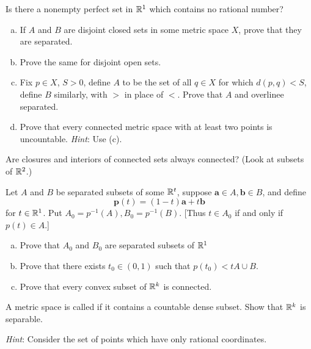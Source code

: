 \begin{myExercise}
    \label{ex:2.18}
    Is there a nonempty perfect set in ${\protect\mathbb R}^1$ which contains no rational number?
\end{myExercise}


\begin{myExercise}
    \label{ex:2.19}
    \begin{enumerate}[(a)]
        \item If $A$ and $B$ are disjoint closed sets in some metric space $X$, prove that they are separated.
        \item Prove the same for disjoint open sets. 
        \item Fix $p \in X$, $S > 0$, define $A$ to be the set of all $q \in X$ for which $d(p, q) < S$, define $B$ similarly, with $>$ in place of $<$. Prove that $A$ and overlinee separated.
        \item Prove that every connected metric space with at least two points is uncountable. \emph{Hint}: Use (c).
    \end{enumerate}
\end{myExercise}

\begin{myExercise}
    \label{ex:2.20}
    Are closures and interiors of connected sets always connected? 
    (Look at subsets of ${\protect\mathbb R}^2$.)
\end{myExercise}

\begin{myExercise}
    \label{ex:2.21}
    Let $A$ and $B$ be separated subsets of some ${\protect\mathbb R}^t$, 
    suppose $\mathbf{a} \in A, \mathbf{b} \in B$,
    and define 
    \begin{equation*}
        \mathbf{p}(t) = (1 - t)\mathbf{a} + t\mathbf{b}
    \end{equation*}
    for $t \in {\protect\mathbb R}^1$. 
    Put $A_0= p^{-1}(A), B_0= p^{-1}(B)$. 
    [Thus $t \in A_0$ if and only if $p(t) \in A$.]
    \begin{enumerate}[(a)]
        \item Prove that $A_0$ and $B_0$ are separated subsets of ${\protect\mathbb R}^1$
        \item Prove that there exists $t_0 \in (0, 1)$ such that $p(t_0) <t A \cup B$.
        \item Prove that every convex subset of ${\protect\mathbb R}^k$ is connected.
    \end{enumerate}
\end{myExercise}

\begin{myExercise}
    \label{ex:2.22}
    A metric space is called  if it contains a countable dense subset. 
    Show that ${\protect\mathbb R}^k$ is separable. 
    
    \emph{Hint}: Consider the set of points which have only rational coordinates.
\end{myExercise}

